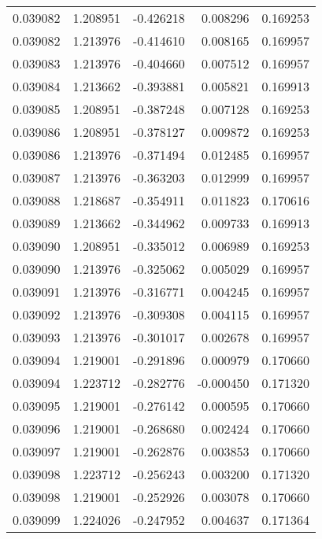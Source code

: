\begin{tabular}{lrrrr}
0.039082    &  1.208951 & -0.426218 &  0.008296 &             0.169253 \\
0.039082    &  1.213976 & -0.414610 &  0.008165 &             0.169957 \\
0.039083    &  1.213976 & -0.404660 &  0.007512 &             0.169957 \\
0.039084    &  1.213662 & -0.393881 &  0.005821 &             0.169913 \\
0.039085    &  1.208951 & -0.387248 &  0.007128 &             0.169253 \\
0.039086    &  1.208951 & -0.378127 &  0.009872 &             0.169253 \\
0.039086    &  1.213976 & -0.371494 &  0.012485 &             0.169957 \\
0.039087    &  1.213976 & -0.363203 &  0.012999 &             0.169957 \\
0.039088    &  1.218687 & -0.354911 &  0.011823 &             0.170616 \\
0.039089    &  1.213662 & -0.344962 &  0.009733 &             0.169913 \\
0.039090    &  1.208951 & -0.335012 &  0.006989 &             0.169253 \\
0.039090    &  1.213976 & -0.325062 &  0.005029 &             0.169957 \\
0.039091    &  1.213976 & -0.316771 &  0.004245 &             0.169957 \\
0.039092    &  1.213976 & -0.309308 &  0.004115 &             0.169957 \\
0.039093    &  1.213976 & -0.301017 &  0.002678 &             0.169957 \\
0.039094    &  1.219001 & -0.291896 &  0.000979 &             0.170660 \\
0.039094    &  1.223712 & -0.282776 & -0.000450 &             0.171320 \\
0.039095    &  1.219001 & -0.276142 &  0.000595 &             0.170660 \\
0.039096    &  1.219001 & -0.268680 &  0.002424 &             0.170660 \\
0.039097    &  1.219001 & -0.262876 &  0.003853 &             0.170660 \\
0.039098    &  1.223712 & -0.256243 &  0.003200 &             0.171320 \\
0.039098    &  1.219001 & -0.252926 &  0.003078 &             0.170660 \\
0.039099    &  1.224026 & -0.247952 &  0.004637 &             0.171364 \\

\end{tabular}
